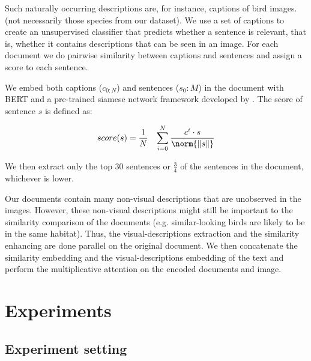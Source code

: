 \documentclass[11pt,a4paper]{article}
\begin{document}
Such naturally occurring descriptions are, for instance, captions of bird images. (not necessarily those species from our dataset). We use a set of captions to create an unsupervised classifier that predicts whether a sentence is relevant, that is, whether it contains descriptions that can be seen in an image.
For each document we do pairwise similarity between captions and sentences and assign a score to each sentence.

We embed both captions ($c_{0:N}$) and sentences ($s_0:M$) in the document with BERT \cite{devlin2018bert} and a pre-trained siamese network framework developed by \citet{reimers2019sentence}. The score of sentence $s$ is defined as:

\begin{equation}
\begin{aligned}
\begin{split}
\label{eq:score}
&score(s)=  \frac{1}{N}
&\sum_{i=0}^{N} \frac{c^i\cdot s}{ \norm{\| s\| }}
\end{split}
\end{aligned}
\end{equation}

 We then extract only the top 30 sentences or $\frac{3}{4}$ of the sentences in the document, whichever is lower.\par   

\par




Our documents contain many non-visual descriptions that are unobserved in the images. However, these non-visual descriptions might still be important to the similarity comparison of the documents (e.g. similar-looking birds are likely to be in the same habitat). Thus, the visual-descriptions extraction and the similarity enhancing are done parallel on the original document. We then concatenate the similarity embedding and the visual-descriptions embedding of the text and perform the multiplicative attention on the encoded documents and image.

\section{Experiments}

\subsection{Experiment setting}
\end{document}
